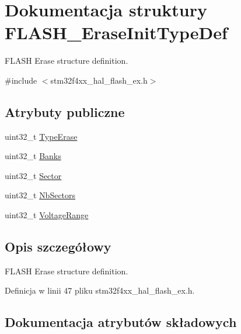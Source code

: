 \hypertarget{struct_f_l_a_s_h___erase_init_type_def}{}\section{Dokumentacja struktury F\+L\+A\+S\+H\+\_\+\+Erase\+Init\+Type\+Def}
\label{struct_f_l_a_s_h___erase_init_type_def}


F\+L\+A\+SH Erase structure definition.  




{\ttfamily \#include $<$stm32f4xx\+\_\+hal\+\_\+flash\+\_\+ex.\+h$>$}

\subsection*{Atrybuty publiczne}
\begin{DoxyCompactItemize}
\item 
uint32\+\_\+t \hyperlink{struct_f_l_a_s_h___erase_init_type_def_a5d08471046a663db76d2252848a7d66c}{Type\+Erase}
\item 
uint32\+\_\+t \hyperlink{struct_f_l_a_s_h___erase_init_type_def_a9590db921fb8d36daf38e097f68fc14f}{Banks}
\item 
uint32\+\_\+t \hyperlink{struct_f_l_a_s_h___erase_init_type_def_a13bac8f9a1ba504a265b44345ecf4d2b}{Sector}
\item 
uint32\+\_\+t \hyperlink{struct_f_l_a_s_h___erase_init_type_def_aec98fec1676cd618e3743158c855a76a}{Nb\+Sectors}
\item 
uint32\+\_\+t \hyperlink{struct_f_l_a_s_h___erase_init_type_def_a3a2a0c2c4ed573bb84c768c6dbb92cc9}{Voltage\+Range}
\end{DoxyCompactItemize}


\subsection{Opis szczegółowy}
F\+L\+A\+SH Erase structure definition. 

Definicja w linii 47 pliku stm32f4xx\+\_\+hal\+\_\+flash\+\_\+ex.\+h.



\subsection{Dokumentacja atrybutów składowych}
\mbox{\label{struct_f_l_a_s_h___erase_init_type_def_a9590db921fb8d36daf38e097f68fc14f}} 
